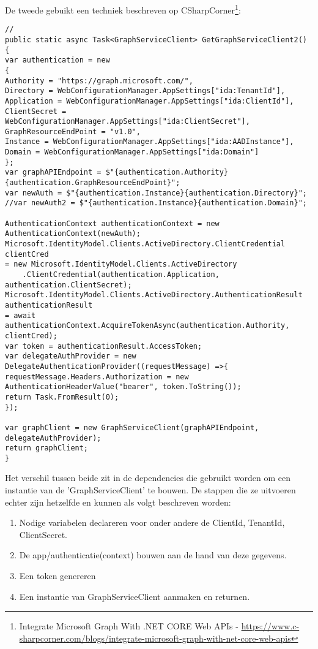 De tweede gebuikt een techniek beschreven op CSharpCorner\footnote{Integrate Microsoft Graph With .NET CORE Web APIs - \url{https://www.c-sharpcorner.com/blogs/integrate-microsoft-graph-with-net-core-web-apis}}:
\begin{lstlisting}[style=CSharpStyle]
//
public static async Task<GraphServiceClient> GetGraphServiceClient2()
{
var authentication = new
{
Authority = "https://graph.microsoft.com/",
Directory = WebConfigurationManager.AppSettings["ida:TenantId"],
Application = WebConfigurationManager.AppSettings["ida:ClientId"],
ClientSecret = WebConfigurationManager.AppSettings["ida:ClientSecret"],
GraphResourceEndPoint = "v1.0",
Instance = WebConfigurationManager.AppSettings["ida:AADInstance"],
Domain = WebConfigurationManager.AppSettings["ida:Domain"]
};
var graphAPIEndpoint = $"{authentication.Authority}{authentication.GraphResourceEndPoint}";
var newAuth = $"{authentication.Instance}{authentication.Directory}";
//var newAuth2 = $"{authentication.Instance}{authentication.Domain}";

AuthenticationContext authenticationContext = new AuthenticationContext(newAuth);
Microsoft.IdentityModel.Clients.ActiveDirectory.ClientCredential clientCred 
= new Microsoft.IdentityModel.Clients.ActiveDirectory
    .ClientCredential(authentication.Application, authentication.ClientSecret);
Microsoft.IdentityModel.Clients.ActiveDirectory.AuthenticationResult authenticationResult 
= await authenticationContext.AcquireTokenAsync(authentication.Authority, clientCred);
var token = authenticationResult.AccessToken;
var delegateAuthProvider = new DelegateAuthenticationProvider((requestMessage) =>{
requestMessage.Headers.Authorization = new AuthenticationHeaderValue("bearer", token.ToString());
return Task.FromResult(0);
});

var graphClient = new GraphServiceClient(graphAPIEndpoint, delegateAuthProvider);
return graphClient;
}
\end{lstlisting}

Het verschil tussen beide zit in de dependencies die gebruikt worden om een instantie van de 'GraphServiceClient' te bouwen. De stappen die ze uitvoeren echter zijn hetzelfde en kunnen als volgt beschreven worden:
\begin{enumerate}
    \item Nodige variabelen declareren voor onder andere de ClientId, TenantId, ClientSecret.
    \item De app/authenticatie(context) bouwen aan de hand van deze gegevens.
    \item Een token genereren
    \item Een instantie van GraphServiceClient aanmaken en returnen.
\end{enumerate}

